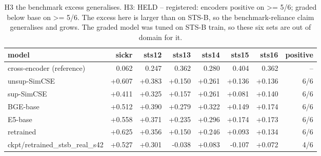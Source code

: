 \begin{table}[t]
\centering
\small
\caption{H3  the benchmark excess generalises. H3: HELD -- registered: encoders positive on >= 5/6; graded below base on >= 5/6. The excess here is larger than on STS-B, so the benchmark-reliance claim generalises and grows. The graded model was tuned on STS-B train, so these six sets are out of domain for it.}
\begin{tabular}{lrrrrrrr}
\toprule
model & sickr & sts12 & sts13 & sts14 & sts15 & sts16 & positive \\
\midrule
cross-encoder (reference) & 0.062 & 0.247 & 0.362 & 0.280 & 0.404 & 0.362 & -- \\
unsup-SimCSE & +0.607 & +0.383 & +0.150 & +0.261 & +0.136 & +0.136 & 6/6 \\
sup-SimCSE & +0.411 & +0.325 & +0.157 & +0.261 & +0.081 & +0.140 & 6/6 \\
BGE-base & +0.512 & +0.390 & +0.279 & +0.322 & +0.149 & +0.174 & 6/6 \\
E5-base & +0.558 & +0.371 & +0.235 & +0.296 & +0.174 & +0.173 & 6/6 \\
retrained & +0.625 & +0.356 & +0.150 & +0.246 & +0.093 & +0.134 & 6/6 \\
ckpt/retrained\_stsb\_real\_s42 & +0.527 & +0.301 & -0.038 & +0.083 & -0.107 & +0.072 & 4/6 \\
\bottomrule
\end{tabular}
\end{table}
